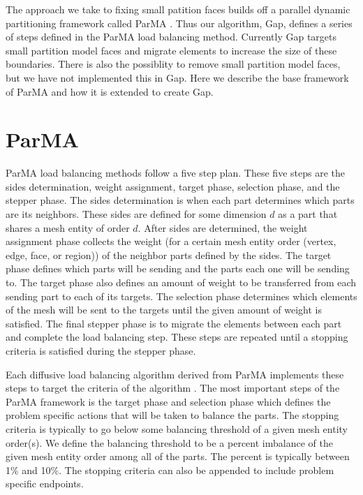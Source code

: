 \documentclass{thesis}
\begin{document}
The approach we take to fixing small patition faces builds off a parallel 
dynamic partitioning framework called ParMA \cite{parma}. Thus our algorithm, 
Gap, defines a series of steps defined in the ParMA load balancing method. 
Currently Gap targets small partition model faces and migrate elements to 
increase the size of these boundaries. There is also the possiblity to remove 
small partition model faces, but we have not implemented this in Gap. Here we 
describe the base framework of ParMA and how it is extended to create Gap.

\section{ParMA}

ParMA load balancing methods follow a five step plan. These five steps 
are the sides determination, weight assignment, target phase, selection
phase, and the stepper phase. The sides determination is when each part 
determines which parts are its neighbors. These sides are defined for some
 dimension $d$ as a part that shares a mesh entity of order $d$. After sides are 
determined, the weight assignment phase collects the weight (for a certain 
mesh entity order (vertex, edge, face, or region)) of the neighbor parts 
defined by the sides. The 
target phase defines which parts will be sending and the parts each one 
will be sending to. The target phase also defines an amount of weight to 
be transferred from each sending part to each of its targets. The selection 
phase determines which elements of the mesh will be sent to the targets 
until the given amount of weight is satisfied. The final stepper phase is 
to migrate the elements between each part and complete the load balancing 
step. These steps are repeated until a stopping criteria is satisfied 
during the stepper phase. 

Each diffusive load balancing algorithm derived from ParMA implements these 
steps to target the criteria of the algorithm \cite{parma}. The most important 
steps of the ParMA framework is the target phase and selection phase which 
defines the problem specific actions that will be taken to balance the parts. 
The stopping criteria is typically to go below some balancing threshold of 
a given mesh entity order(s). We define the balancing threshold to be a 
percent imbalance of the given mesh entity order among all of the parts.
The percent is typically between 1\% and 10\%. The stopping criteria can also 
be appended to include problem specific endpoints.
 
\end{document}
